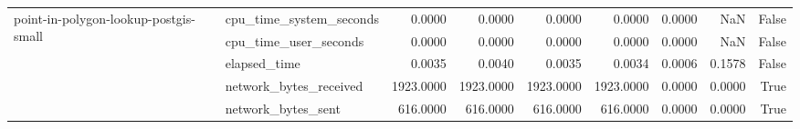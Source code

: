 \begin{tabular}{llrrrrrrr}
\cline{1-9}
\multirow[t]{5}{*}{point-in-polygon-lookup-postgis-small} & cpu\_time\_system\_seconds & 0.0000 & 0.0000 & 0.0000 & 0.0000 & 0.0000 & NaN & False \\
 & cpu\_time\_user\_seconds & 0.0000 & 0.0000 & 0.0000 & 0.0000 & 0.0000 & NaN & False \\
 & elapsed\_time & 0.0035 & 0.0040 & 0.0035 & 0.0034 & 0.0006 & 0.1578 & False \\
 & network\_bytes\_received & 1923.0000 & 1923.0000 & 1923.0000 & 1923.0000 & 0.0000 & 0.0000 & True \\
 & network\_bytes\_sent & 616.0000 & 616.0000 & 616.0000 & 616.0000 & 0.0000 & 0.0000 & True \\
\cline{1-9}
\bottomrule
\end{tabular}
